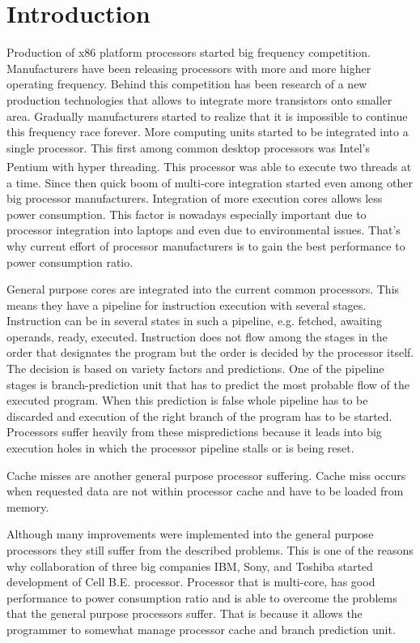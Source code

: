 \chapter{Introduction}

Production of x86 platform processors started big frequency competition.
Manufacturers have been releasing processors with more and more higher operating frequency.
Behind this competition has been research of a new production technologies that allows to integrate more transistors onto smaller area.
Gradually manufacturers started to realize that it is impossible to continue this frequency race forever.
More computing units started to be integrated into a single processor.
This first among common desktop processors was Intel's Pentium\textsuperscript{\textregistered} with hyper threading.
This processor was able to execute two threads at a time.
Since then quick boom of multi-core integration started even among other big processor manufacturers.
Integration of more execution cores allows less power consumption.
This factor is nowadays especially important due to processor integration into laptops and even due to environmental issues.
That's why current effort of processor manufacturers is to gain the best performance to power consumption ratio.

General purpose cores are integrated into the current common processors.
This means they have a pipeline for instruction execution with several stages.
Instruction can be in several states in such a pipeline, e.g. fetched, awaiting operands, ready, executed.
Instruction does not flow among the stages in the order that designates the program but the order is decided by the processor itself.
The decision is based on variety factors and predictions.
One of the pipeline stages is branch-prediction unit that has to predict the most probable flow of the executed program.
When this prediction is false whole pipeline has to be discarded and execution of the right branch of the program has to be started.
Processors suffer heavily from these mispredictions because it leads into big execution holes in which the processor pipeline stalls or is being reset.

Cache misses are another general purpose processor suffering.
Cache miss occurs when requested data are not within processor cache and have to be loaded from memory.

Although many improvements were implemented into the general purpose processors they still suffer from the described problems.
This is one of the reasons why collaboration of three big companies IBM, Sony, and Toshiba started development of Cell B.E. processor.
Processor that is multi-core, has good performance to power consumption ratio and is able to overcome the problems that the general purpose processors suffer.
That is because it allows the programmer to somewhat manage processor cache and branch prediction unit.

